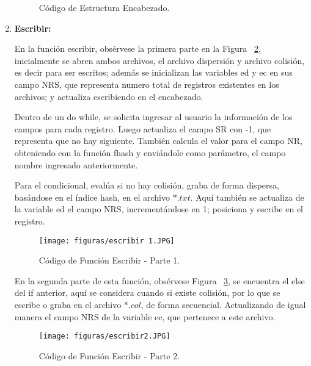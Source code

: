 \documentclass[10pt,conference]{IEEEtran}
\begin{document}
\begin{enumerate}[]
\begin{figure}[H]
\begin{center}
            \caption{Código de Estructura Encabezado.}
            \label{f-reg} 
            \end{center}
        \end{figure}
    \item {\textbf{Escribir:}}
        \par En la función escribir, obsérvese la primera parte en la Figura ~\ref{f-escribir1}, inicialmente se abren ambos archivos, el archivo dispersión y archivo colisión, es decir para ser escritos; además se inicializan las variables ed y ec en sus campo NRS, que representa numero total de registros existentes en los archivos; y actualiza escribiendo en el encabezado. 
        
        Dentro de un do while, se solicita ingresar al usuario la información de los campos para cada registro. Luego actualiza el campo SR con -1, que representa que no hay siguiente. También calcula el valor para el campo NR, obteniendo con la función fhash y enviándole como parámetro, el campo nombre ingresado anteriormente.
        
        Para el condicional, evalúa si no hay colisión, graba de forma dispersa, basándose en el índice hash, en el archivo $*.txt$. Aquí también se actualiza de la variable ed el campo NRS, incrementándose en 1; posiciona y escribe en el registro.
        
        \begin{figure}[H]
            \begin{center}
            \texttt{[image: figuras/escribir 1.JPG]}
            \caption{Código de Función Escribir - Parte 1.}
            \label{f-escribir1} 
            \end{center}
        \end{figure}
        
        En la segunda parte de esta función, obsérvese Figura ~\ref{f-escribir2}, se encuentra el else del if anterior, aquí se considera cuando si existe colisión, por lo que se escribe o graba en el archivo $*.col$, de forma secuencial. Actualizando de igual manera el campo NRS de la variable ec, que pertenece a este archivo.
        
        \begin{figure}[H]
            \begin{center}
            \texttt{[image: figuras/escribir2.JPG]}
            \caption{Código de Función Escribir - Parte 2.}
            \label{f-escribir2} 
            \end{center}
        \end{figure}
        

\end{enumerate}
\end{document}
